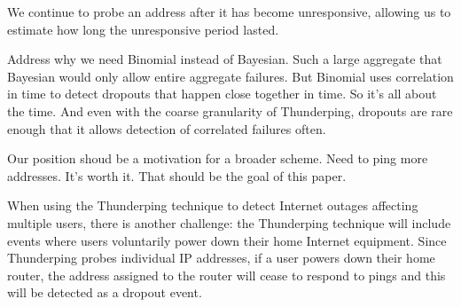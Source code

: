 We continue to probe an address after it has become unresponsive,
allowing us to estimate how long the unresponsive period lasted.

Address why we need Binomial instead of Bayesian. Such a large
aggregate that Bayesian would only allow entire aggregate
failures. But Binomial uses correlation in time to detect dropouts
that happen close together in time. So it's all about the time. And
even with the coarse granularity of Thunderping, dropouts are rare
enough that it allows detection of correlated failures often.

Our position shoud be a motivation for a broader scheme. Need to ping
more addresses. It's worth it. That should be the goal of this paper.

When using the Thunderping technique to detect Internet outages affecting
multiple users, there is another challenge: the Thunderping technique
will include events where users voluntarily power down their home
Internet equipment. Since Thunderping probes individual IP addresses, if a user
powers down their home router, the address assigned to the router will
cease to respond to pings and this will be detected as a dropout event.

